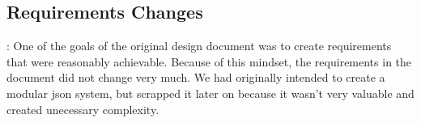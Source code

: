 \subsection{Requirements Changes}:
One of the goals of the original design document was to create requirements that were reasonably achievable. Because of this mindset, the requirements in the document did not change very much.
We had originally intended to create a modular json system, but scrapped it later on because it wasn't very valuable and created unecessary complexity.
